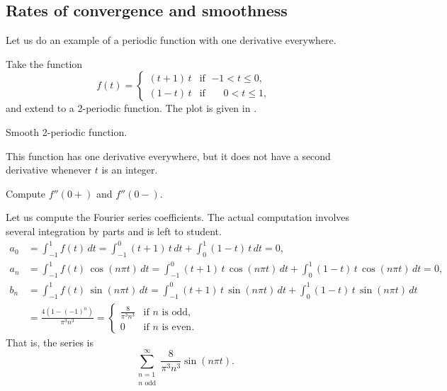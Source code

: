 \documentclass{ximera}
\begin{document}
\subsection{Rates of convergence and smoothness}

Let us do an example of a periodic function with one derivative everywhere.

\begin{example}
    Take the function
    \begin{equation*}
        f(t) =
        \begin{cases}
            (t+1)\,t & \text{if } \; {-1} < t \leq 0 , \\
            (1-t)\,t & \text{if } \; \phantom{-}0 < t \leq 1 ,
        \end{cases}
    \end{equation*}
    and extend to a 2-periodic function.  The plot is given in .
    
    \begin{myfig}
        \capstart
        \caption{Smooth 2-periodic function.\label{gfs:smoothexfig}}
    \end{myfig}
    
    This function has one derivative everywhere, but it does not have a second derivative whenever $t$ is an integer.
    
    \begin{exercise}
        Compute $f''(0+)$ and $f''(0-)$.
    \end{exercise}
    
    Let us compute the Fourier series coefficients.  The actual computation involves several integration by parts and is left to student.
    \begin{align*}
        a_0 & = \int_{-1}^1 f(t) \, dt = \int_{-1}^0 (t+1)\,t \, dt + \int_0^1 (1-t)\,t \, dt = 0 , \\
        a_n & =  \int_{-1}^1 f(t) \, \cos (n\pi t) \, dt = \int_{-1}^0 (t+1)\,t \, \cos (n \pi t) \, dt +
            \int_0^1 (1-t)\,t \, \cos (n \pi t) \, dt = 0, \\
        b_n & = \int_{-1}^1 f(t) \, \sin (n\pi t) \, dt =  \int_{-1}^0 (t+1)\,t \, \sin (n \pi t) \, dt +
            \int_0^1 (1-t)\,t \, \sin (n \pi t) \, dt \\
        & = \frac{4 ( 1-{(-1)}^n)}{\pi^3 n^3}  =
        \begin{cases}
            \frac{8}{\pi^3 n^3} & \text{if } n \text{ is odd} , \\
            0 & \text{if } n \text{ is even} .
        \end{cases}
    \end{align*}
    That is, the series is
    \begin{equation*}
        \sum_{\substack{n=1 \\ n \text{ odd}}}^\infty \frac{8}{\pi^3 n^3} \sin (n \pi t) .
    \end{equation*}
    

\end{example}
\end{document}
